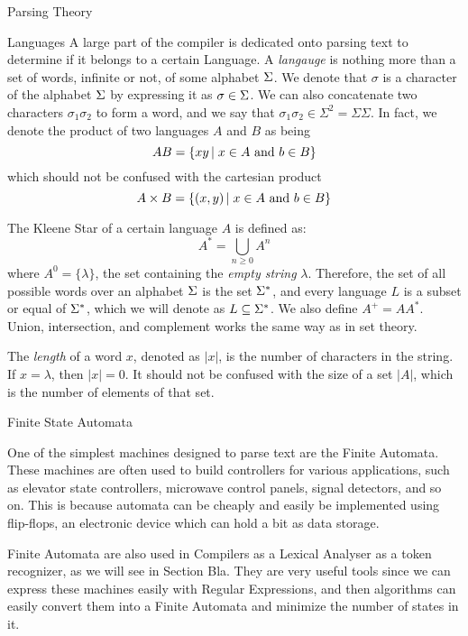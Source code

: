 \begin{section}{Parsing Theory}

\begin{subsection}{Languages}
A large part of the compiler is dedicated onto parsing text to determine if
it belongs to a certain Language. A \textit{langauge} is nothing more than
a set of words, infinite or not, of some alphabet $\Sigma$. We denote that
$\sigma$ is a character of the alphabet $\Sigma$ by expressing it as
$\sigma \in \Sigma$. We can also concatenate two characters $\sigma_1 \sigma_2$
to form a word, and we say that $\sigma_1 \sigma_2 \in \Sigma^2 = \Sigma\Sigma$.
In fact, we denote the product of two languages $A$ and $B$ as being
$$AB = \{xy\,|\;x \in A \text{ and } b \in B\}$$
which should not be confused with the cartesian product
$$A \times B = \{(x, y)\,|\;x \in A \text{ and } b \in B\}$$

The Kleene Star of a certain language $A$ is defined as:
$$A^* = \bigcup_{n \geq 0} A^n$$
where $A^0 = \{\lambda\}$, the set containing the \textit{empty string} $\lambda$.
Therefore, the set of all possible words over an alphabet $\Sigma$ is the set
$\Sigma^*$, and every language $L$ is a subset or equal of $\Sigma^*$, which we will
denote as $L \subseteq \Sigma^*$. We also define $A^+ = AA^*$. Union, intersection,
and complement works the same way as in set theory.

The \textit{length} of a word $x$, denoted as $|x|$, is the number of characters
in the string. If $x = \lambda$, then $|x| = 0$. It should not be confused with
the size of a set $|A|$, which is the number of elements of that set.

\end{subsection}

\begin{subsection}{Finite State Automata}

One of the simplest machines designed to parse text are the
Finite Automata. These machines are often used to build controllers for various
applications, such as elevator state controllers, microwave control panels,
signal detectors, and so on. This is because automata can be cheaply and easily
be implemented using flip-flops, an electronic device which can hold a bit as
data storage.

Finite Automata are also used in Compilers as a Lexical Analyser as a token
recognizer, as we will see in Section Bla. They are very useful tools since we
can express these machines easily with Regular Expressions, and then algorithms
can easily convert them into a Finite Automata and minimize the number of
states in it.


\end{subsection}
\end{section}
